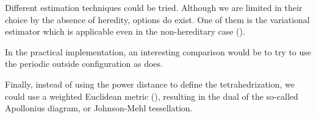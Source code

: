 Different estimation techniques could be tried. Although we are limited in their choice by the absence of heredity, options do exist. One of them is the variational estimator which is applicable even in the non-hereditary case (\cite{BaddeleyDereudre2013}).

In the practical implementation, an interesting comparison would be to try to use the periodic outside configuration as \cite{DereudreLavancier2011} does.

Finally, instead of using the power distance to define the tetrahedrization, we could use a weighted Euclidean metric (\cite{Gavrilova}), resulting in the dual of the so-called Apollonius diagram, or Johnson-Mehl tessellation. 

